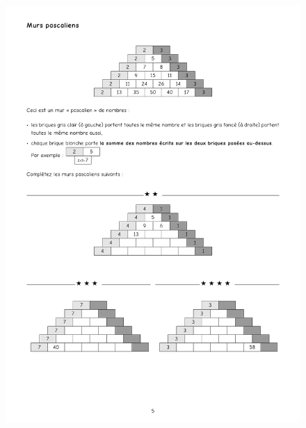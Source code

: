 \begin{figure}[H]
  \centering
  \includegraphics[width=0.95\linewidth]{4xDM/murs.pdf}
\end{figure}

